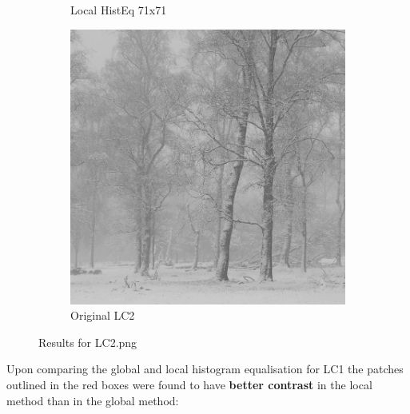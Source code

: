 \documentclass[12pt]{article}
\begin{document}
\begin{figure}[h!]
\begin{subfigure}[b]{0.3\textwidth}
            \caption{Local HistEq 71x71}
        \end{subfigure}
        \hfill
        \begin{subfigure}[b]{0.3\textwidth}
            \centering
            \includegraphics[width=\textwidth]{../images/LC2.jpg}
            \caption{Original LC2}
        \end{subfigure}
    
        \caption{Results for LC2.png}
    \end{figure}

    Upon comparing the global and local histogram equalisation for LC1 the patches outlined in the red boxes
    were found to have \textbf{better contrast} in the local method than in the global method:
\end{document}
